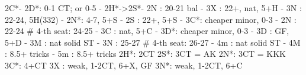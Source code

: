 2C*- 
2D*: 0-1 CT; or 0-5
   - 2H*->2S*- 2N : 20-21 bal
             - 3X : 22+, nat, 5+H
             - 3N : 22-24, 5H(332)
        - 2N*: 4-7, 5+S
   - 2S : 22+, 5+S
        - 3C*: cheaper minor, 0-3
   - 2N : 22-24  # 4-th seat: 24-25
   - 3C : nat, 5+C
        - 3D*: cheaper minor, 0-3
   - 3D : GF, 5+D
   - 3M : nat solid ST
   - 3N : 25-27  # 4-th seat: 26-27
   - 4m : nat solid ST
   - 4M : 8.5+ tricks
   - 5m : 8.5+ tricks
2H*: 2CT
2S*: 3CT = AK
2N*: 3CT = KKK
3C*: 4+CT
3X : weak, 1-2CT, 6+X, GF
3N*: weak, 1-2CT, 6+C
